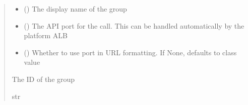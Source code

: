 \documentclass[letterpaper,10pt,english]{sphinxmanual}
\begin{document}
\begin{fulllineitems}
\begin{fulllineitems}
\begin{sphinxVerbatim}[commandchars=\\\{\}]
 
  
\end{sphinxVerbatim}
\begin{quote}\begin{description}
\begin{itemize}
\item {} 
\sphinxAtStartPar
{} () \textendash{} The display name of the group

\item {} 
\sphinxAtStartPar
{} (\sphinxstyleliteralemphasis{\sphinxupquote{ (}}\sphinxstyleliteralemphasis{\sphinxupquote{)}}) \textendash{} The API port for the call. This can be handled automatically by the platform ALB

\item {} 
\sphinxAtStartPar
{} (\sphinxstyleliteralemphasis{\sphinxupquote{ (}}\sphinxstyleliteralemphasis{\sphinxupquote{)}}) \textendash{} Whether to use port in URL formatting. If None, defaults to class value

\end{itemize}

\sphinxAtStartPar
{} \textendash{} The ID of the group

\sphinxAtStartPar
str

\end{description}\end{quote}


\end{fulllineitems}
\end{fulllineitems}
\end{document}
